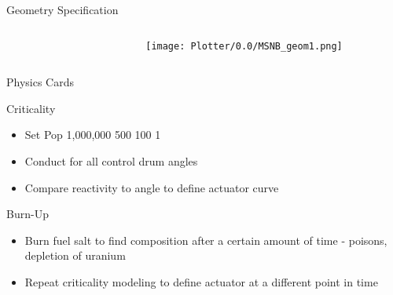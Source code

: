 \documentclass[aspectratio=169,pdftex,dvipsnames]{beamer}
\begin{document}
\begin{frame}{Geometry Specification}
    \begin{columns}
    \begin{column}{0.6\textwidth}
    \begin{figure}
    \end{figure}
    \end{column}
    \begin{column}{0.4\textwidth}
        \begin{figure}[ht!]
            \centering
            \texttt{[image: Plotter/0.0/MSNB\_geom1.png]}
        \end{figure}
    \end{column}
    \end{columns}
\end{frame}

\begin{frame}{Physics Cards}
    \begin{block}{Criticality}
        \begin{itemize}
            \item Set Pop 1,000,000 500 100 1
            \item Conduct for all control drum angles 
            \item Compare reactivity to angle to define actuator curve
        \end{itemize}
    \end{block}
    \begin{block}{Burn-Up}
        \begin{itemize}
            \item Burn fuel salt to find composition after a certain amount of time - poisons, depletion of uranium
            \item Repeat criticality modeling to define actuator at a different point in time
        \end{itemize}
    \end{block}
\end{frame}
\end{document}
